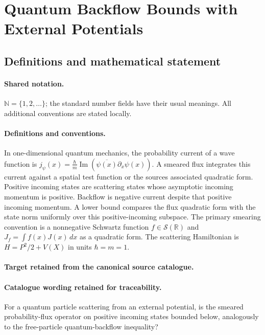 \documentclass[11pt]{article}
\begin{document}
\section{Quantum Backflow Bounds with External Potentials}\label{statement}

\subsection{Definitions and mathematical statement}

\paragraph{Shared notation.}$\mathbb N=\{1,2,\ldots\}$; the standard number fields have their usual meanings. All additional conventions are stated locally.


\paragraph{Definitions and conventions.}
In one-dimensional quantum mechanics, the probability current of a wave function is $j_\psi(x)=\frac{\hbar}{m}\operatorname{Im}(\overline{\psi(x)}\partial_x\psi(x))$. A smeared flux integrates this current against a spatial test function or the source\textquotesingle s associated quadratic form. Positive incoming states are scattering states whose asymptotic incoming momentum is positive. Backflow is negative current despite that positive incoming momentum. A lower bound compares the flux quadratic form with the state norm uniformly over this positive-incoming subspace. The primary smearing convention is a nonnegative Schwartz function $f\in\mathcal S(\mathbb R)$ and $J_f=\int f(x)J(x)\,dx$ as a quadratic form. The scattering Hamiltonian is $H=P^2/2+V(X)$ in units $\hbar=m=1$.

\paragraph{Target retained from the canonical source catalogue.}
\paragraph{Catalogue wording retained for traceability.}
For a quantum particle scattering from an external potential, is the smeared probability-flux operator on positive incoming states bounded below, analogously to the free-particle quantum-backflow inequality?
\end{document}
